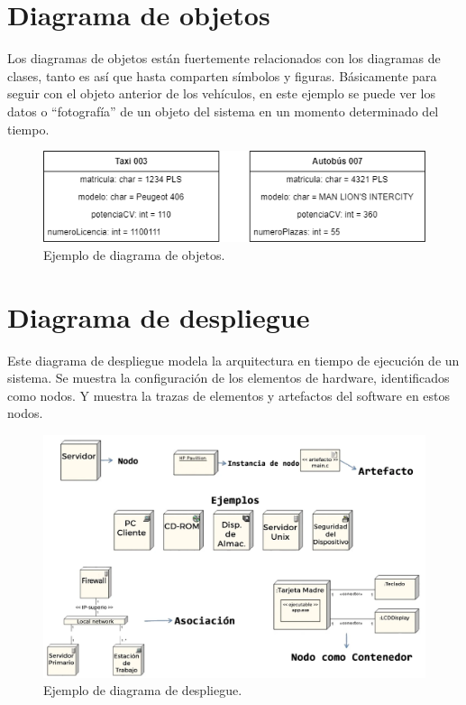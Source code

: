 \documentclass[a4paper, 12pt]{book}
\begin{document}
\section{Diagrama de objetos}
Los diagramas de objetos están fuertemente relacionados con los diagramas de clases, tanto es así que hasta comparten símbolos y figuras. Básicamente para seguir con el objeto anterior de los vehículos, en este ejemplo se puede ver los datos o ``fotografía'' de un objeto del sistema en un momento determinado del tiempo. 
\begin{figure}
	\centering
	\includegraphics[width=14cm, keepaspectratio]{img/diagrama_objetos.png}
	\caption{Ejemplo de diagrama de objetos.}\label{fig:diagrama_objetos}
\end{figure}

\section{Diagrama de despliegue}
Este diagrama de despliegue modela la arquitectura en tiempo de ejecución de un sistema. Se muestra la configuración de los elementos de hardware, identificados como nodos. Y muestra la trazas de elementos y artefactos del software en estos nodos. 
\begin{figure}
	\centering
	\includegraphics[width=16cm, keepaspectratio]{img/diagrama_despliegue.png}
	\caption{Ejemplo de diagrama de despliegue.}\label{fig:diagrama_despliegue}
\end{figure}
\end{document}
